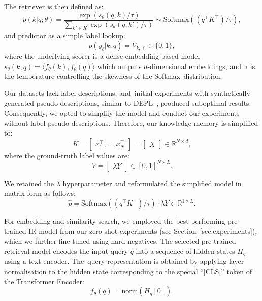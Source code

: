 \documentclass[make,article,accept,pdftex,moreauthors]{Definitions/mdpi}
\begin{document}
The retriever is then defined as:
\begin{equation}
p(k | q; \theta) = \frac{\exp(s_{\theta}(q, k)/\tau)}{\sum_{k' \in K} \exp(s_{\theta}(q, k')/\tau)} \sim \text{Softmax}((q^{\top}K^{\top})/\tau),
\end{equation}
and predictor as a simple label lookup:
\begin{equation}
p(y_{\ell} | k, q) = V_{k, \ell} \in \{0, 1\},
\end{equation}
where the underlying scorer is a dense embedding-based model $s_{\theta}(k, q) = \langle f_{\theta}(k), f_{\theta}(q) \rangle$ which outputs $d$-dimensional embeddings, and~$\tau$ is the temperature controlling the skewness of the Softmax~distribution.

Our datasets lack label descriptions, and~initial experiments with synthetically generated pseudo-descriptions, similar to DEPL~\citep{zhang2023longtailed}, produced suboptimal results. 
Consequently, we opted to simplify the model and conduct our experiments without label pseudo-descriptions.
Therefore, our knowledge memory is simplified to:
\begin{equation}
K = 
\begin{bmatrix}
x_1^\top, \ldots, x_N^\top
\end{bmatrix} 
= 
\begin{bmatrix}
X
\end{bmatrix} 
\in \mathbb{R}^{N \times d},
\end{equation}
where the ground-truth label values are:
\begin{equation}
V = 
\begin{bmatrix}
\lambda Y
\end{bmatrix} 
\in [0, 1]^{N \times L}.
\end{equation}

We retained the $\lambda$ hyperparameter and reformulated the simplified model in matrix form as follows:
\begin{equation}
\hat{p} = \text{Softmax}\left((q^{\top}K^{\top})/\tau\right) \cdot \lambda Y \in \mathbb{R}^{1 \times L}.
\end{equation}

For embedding and similarity search, we employed the best-performing pre-trained IR model from our zero-shot experiments (see Section~\ref{sec:experiments}), which we further fine-tuned using hard negatives.
The selected pre-trained retrieval model encodes the input query $q$ into a sequence of hidden states $H_q$ using a text encoder. The~query representation is obtained by applying layer normalisation to the hidden state corresponding to the special ``[CLS]'' token of the Transformer Encoder:
\begin{equation}
f_{\theta}(q) = \text{norm}(H_q[0]).
\end{equation}
\end{document}
